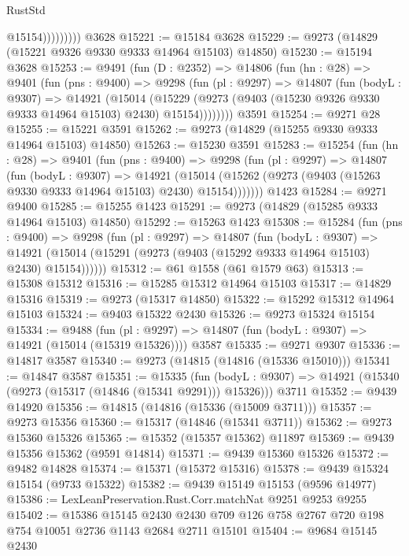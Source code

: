 \begin{lexlean}{RustStd}
\begin{coremodule}
{\begin{coremodule}
{{{{{{{{{{{{{{{{{{{{{{{{{{{{{{{{{{{{{{{{{{{{{{{{{{{{{{{                      @15154)))))))))
    @3628
@15221 := @15184 @3628
@15229 := @9273 (@14829 (@15221 @9326 @9330 @9333 @14964 @15103) @14850)
@15230 := @15194 @3628
@15253 := @9491
    (fun (D : @2352) =>
    @14806
      (fun (hn : @28) =>
      @9401
        (fun (pns : @9400) =>
        @9298
          (fun (pl : @9297) =>
          @14807
            (fun (bodyL : @9307) =>
            @14921
              (@15014
                (@15229 (@9273 (@9403 (@15230 @9326 @9330 @9333 @14964 @15103) @2430) @15154))))))))
    @3591
@15254 := @9271 @28
@15255 := @15221 @3591
@15262 := @9273 (@14829 (@15255 @9330 @9333 @14964 @15103) @14850)
@15263 := @15230 @3591
@15283 := @15254
    (fun (hn : @28) =>
    @9401
      (fun (pns : @9400) =>
      @9298
        (fun (pl : @9297) =>
        @14807
          (fun (bodyL : @9307) =>
          @14921
            (@15014 (@15262 (@9273 (@9403 (@15263 @9330 @9333 @14964 @15103) @2430) @15154)))))))
    @1423
@15284 := @9271 @9400
@15285 := @15255 @1423
@15291 := @9273 (@14829 (@15285 @9333 @14964 @15103) @14850)
@15292 := @15263 @1423
@15308 := @15284
    (fun (pns : @9400) =>
    @9298
      (fun (pl : @9297) =>
      @14807
        (fun (bodyL : @9307) =>
        @14921 (@15014 (@15291 (@9273 (@9403 (@15292 @9333 @14964 @15103) @2430) @15154))))))
@15312 := @61 @1558 (@61 @1579 @63)
@15313 := @15308 @15312
@15316 := @15285 @15312 @14964 @15103
@15317 := @14829 @15316
@15319 := @9273 (@15317 @14850)
@15322 := @15292 @15312 @14964 @15103
@15324 := @9403 @15322 @2430
@15326 := @9273 @15324 @15154
@15334 := @9488
    (fun (pl : @9297) => @14807 (fun (bodyL : @9307) => @14921 (@15014 (@15319 @15326))))
    @3587
@15335 := @9271 @9307
@15336 := @14817 @3587
@15340 := @9273 (@14815 (@14816 (@15336 @15010)))
@15341 := @14847 @3587
@15351 := @15335
    (fun (bodyL : @9307) => @14921 (@15340 (@9273 (@15317 (@14846 (@15341 @9291))) @15326)))
    @3711
@15352 := @9439 @14920
@15356 := @14815 (@14816 (@15336 (@15009 @3711)))
@15357 := @9273 @15356
@15360 := @15317 (@14846 (@15341 @3711))
@15362 := @9273 @15360 @15326
@15365 := @15352 (@15357 @15362) @11897
@15369 := @9439 @15356 @15362 (@9591 @14814)
@15371 := @9439 @15360 @15326
@15372 := @9482 @14828
@15374 := @15371 (@15372 @15316)
@15378 := @9439 @15324 @15154 (@9733 @15322)
@15382 := @9439 @15149 @15153 (@9596 @14977)
@15386 := LexLeanPreservation.Rust.Corr.matchNat @9251 @9253 @9255
@15402 := @15386
    @15145
    @2430
    @2430
    @709
    @126
    @758
    @2767
    @720
    @198
    @754
    @10051
    @2736
    @1143
    @2684
    @2711
    @15101
@15404 := @9684 @15145 @2430
}}}}}}}}}}}}}}}}}}}}}}}}}}}}}}}}}}}}}}}}}}}}}}}}}}}}}}}
\end{coremodule}}
\end{coremodule}
\end{lexlean}
